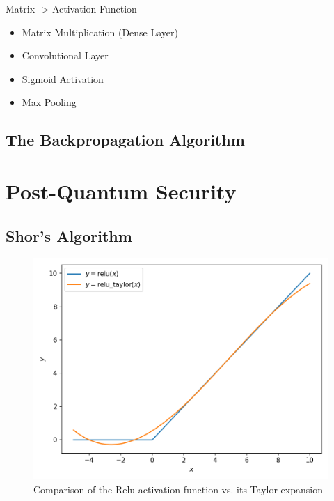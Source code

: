 Matrix -> Activation Function
\begin{itemize}
  \item Matrix Multiplication (Dense Layer)
  \item Convolutional Layer
  \item Sigmoid Activation
  \item Max Pooling
\end{itemize}

\subsection{The Backpropagation Algorithm}

\section{Post-Quantum Security}
\label{sec:post-quantum-sec}
\subsection{Shor's Algorithm}

\begin{figure}[H]
  \centering
  \includegraphics[width=0.8\linewidth]{figures/taylor-relu.png}
  \caption{Comparison of the Relu activation function vs. its Taylor expansion}
\end{figure}
